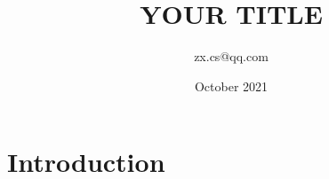 \documentclass{article}
\title{YOUR TITLE}
\author{zx.cs@qq.com}
\date{October 2021}
\begin{document}
\maketitle

\section{Introduction}
\end{document}
